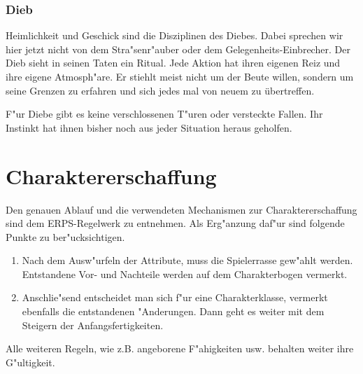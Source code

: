 \subsubsection{Dieb}
\par Heimlichkeit und Geschick sind die Disziplinen des Diebes. Dabei sprechen wir hier jetzt 
nicht von dem Stra"senr"auber oder dem Gelegenheits-Einbrecher. 
Der Dieb sieht in seinen Taten ein Ritual. Jede Aktion hat ihren eigenen Reiz und ihre eigene 
Atmosph"are. Er stiehlt meist nicht um der Beute willen, sondern um seine Grenzen zu erfahren und sich jedes 
mal von neuem zu übertreffen.
\par F"ur Diebe gibt es keine verschlossenen T"uren oder versteckte Fallen. Ihr Instinkt hat 
ihnen bisher noch aus jeder Situation heraus geholfen.

\section{Charaktererschaffung}
\par Den genauen Ablauf und die verwendeten Mechanismen zur Charaktererschaffung sind dem ERPS-Regelwerk\cite{erps1} zu 
entnehmen. Als Erg"anzung daf"ur sind folgende Punkte zu ber"ucksichtigen.
\begin{enumerate}
\item Nach dem Ausw"urfeln der Attribute, muss die Spielerrasse gew"ahlt werden. Entstandene Vor- und Nachteile 
werden auf dem Charakterbogen vermerkt.
\item Anschlie"send entscheidet man sich f"ur eine Charakterklasse, vermerkt ebenfalls die entstandenen "Anderungen. 
Dann geht es weiter mit dem Steigern der Anfangsfertigkeiten.
\end{enumerate}
\par Alle weiteren Regeln, wie z.B. angeborene F"ahigkeiten usw. behalten weiter ihre G"ultigkeit.
